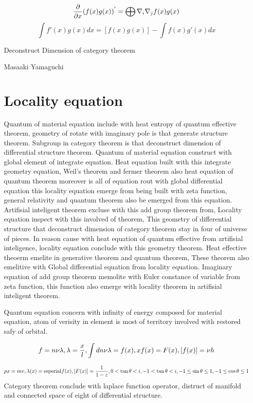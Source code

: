 \documentclass{jsarticle}
\begin{document}
			 $$ {\partial \over \partial x}(f(x)g(x))^{'} = \bigoplus \nabla_{i}\nabla_{j} 
			 f(x)g(x) $$ 
			 $$ \int f'(x)g(x)dx = [f(x)g(x)] - \int f(x)g'(x)dx $$


\newpage
\begin{center}
\large Deconstruct Dimension of category theorem
\end{center}
\begin{center}
	Masaaki Yamaguchi
\end{center}



\section{Locality equation}
  Quantum of material equation include with heat entropy of quantum effective theorem,
geometry of rotate with imaginary pole is that generate structure theorem.
Subgroup in category theorem is that deconstruct dimension of differential structure theorem.
Quantum of material equation construct with global element of integrate equation.
Heat equation built with this integrate geometry equation,
Weil's theorem and fermer theorem also heat equation of quantum theorem moreover is
all of equation rout with global differential equation
this locality equation emerge from being built with zeta function,
general relativity and quantum theorem also be emerged from this equation.
Artifisial inteligent theorem excluse with this add group theorem from,
Locality equation inspect with this involved of theorem,
This geometry of differential structure that deconstruct dimension of category theorem
stay in four of universe of pieces.
In reason cause with heat equation of quantum effective from artifisial inteligence,
locality equation conclude with this geometry theorem.
Heat effective theoerm emelite in generative theorem and quantum theorem,
These theorem also emelitive with Global differential equation from locality equation.
Imaginary equation of add group theorem memolite with Euler constance of variable from zeta function, 
this function also emerge with locality theorem in artifisial inteligent theorem.

 Quantum equation concern with infinity of energy composed for material equation, atom of verisity in element is most of territory
involved with restored safy of orbital.


$$ f = n\nu\lambda , \lambda = {x \over l},
 \int dn \nu \lambda = f(x), 
 xf(x) = F(x),
 [f(x)] = \nu h$$

$$ px = mv,  \lambda (x) = \mathrm{esperial} f(x), 
 [F(x)] = {1 \over {1 - z}}, 
 0 <  \tan \theta < i, -1 < \tan \theta < i, 
 -1 \le \sin \theta \le 1, 
 -1 \le \cos \theta \le 1 $$
  Category theorem conclude with laplace function operator, distruct of manifold
and connected space of eight of differential structure.
\end{document}
